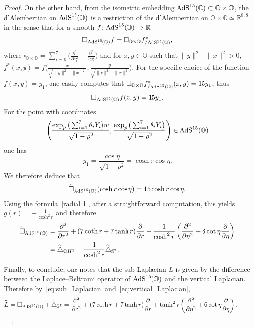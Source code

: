 \documentclass[pdftex]{sigma}
\numberwithin{equation}{section}
\begin{document}
\begin{proof}
On the other hand, from the isometric embedding ${\rm AdS}^{15}(\mathbb{O}) \subset \mathbb{O} \times \mathbb{O}$, the d'Alembertian on ${\rm AdS}^{15}(\mathbb{O})$ is a restriction of the d'Alembertian on $\mathbb{O} \times \mathbb{O} \simeq \mathbb{R}^{8,8}$ in the sense that for a smooth $f\colon {\rm AdS}^{15}(\mathbb{O}) \to \mathbb{R}$
\[
\square_{{\rm AdS}^{15}(\mathbb{O})} f =\square_{\mathbb O \times \mathbb O} f^*_{/ {\rm AdS}^{15}(\mathbb{O})},
\]
where $\square_{\mathbb O \times \mathbb O}=\sum_{i=0}^7 \big( \frac{\partial^2}{\partial x_i^2} - \frac{\partial^2}{\partial y_i^2} \big)$ and for $x,y \in \mathbb O$ such that $\| y\|^2 -\|x\|^2 >0$, $f^*(x,y)= f \big( \frac{x}{\sqrt{\| y \|^2 -\| x \|^2}}, \frac{y}{\sqrt{\| y \|^2 -\| x \|^2}}\big)$. For the specific choice of the function $f(x,y)=y_1$, one easily computes that $ \square_{\mathbb O \times \mathbb O} f^*_{/ {\rm AdS}^{15}(\mathbb{O})}(x,y) = 15y_1$, thus
\[
\square_{{\rm AdS}^{15}(\mathbb{O})} f (x,y)=15y_1.
\]
For the point with coordinates
\[
\left(\frac{ \exp_p\big(\sum_{i=1}^{7}\theta_i Y_i\big) w}{\sqrt{1-{\rho}^2}},\frac{ \exp_p\big(\sum_{i=1}^{7}\theta_i Y_i\big)}{\sqrt{1-{\rho}^2}}\right)\in {\rm AdS}^{15}(\mathbb{O})
\]
one has
\[
y_1=\frac{\cos \eta}{\sqrt{1-{\rho}^2}}= \cosh r \cos \eta.
\]
We therefore deduce that
\[
\widetilde{\square}_{{\rm AdS}^{15}(\mathbb{O})}(\cosh r \cos \eta) =15 \cosh r \cos \eta.
\]
Using the formula~\eqref{radial 1}, after a straightforward computation, this yields $g(r)=-\frac{1}{\cosh^2 r}$ and therefore
\begin{align*}
\widetilde{\square}_{{\rm AdS}^{15}(\mathbb{O})}&=\frac{{\partial}^2}{\partial {r}^2}+(7\coth r+7\tanh r)\frac{{\partial}}{\partial {r}} -\frac{1}{\cosh^2 r} \left(\frac{{\partial}^2}{\partial {\eta}^2}+6\cot \eta\frac{{\partial}}{\partial {\eta}} \right)\nonumber\\
& =\widetilde{\triangle}_{\mathbb{O}H^1}-\frac{1}{\cosh^2 r}\widetilde{\triangle}_{\mathbb{S}^7}.%
\end{align*}

Finally, to conclude, one notes that the sub-Laplacian $L$ is given by the difference between the Laplace--Beltrami operator of ${\rm AdS}^{15}(\mathbb{O})$ and the vertical Laplacian. Therefore by~\eqref{eq:sub_Laplacian} and~\eqref{eq:vertical_Laplacian},
\begin{align*}
\widetilde{L} =\tilde{\square}_{{\rm AdS}^{15}(\mathbb{O})}+ \tilde{\triangle}_{\mathbb{S}^{7}}
 = \frac{{\partial}^2}{\partial {r}^2}+(7\coth r+7\tanh r)\frac{{\partial}}{\partial {r}}+{\tanh^2 r}\left(\frac{{\partial}^2}{\partial {\eta}^2}+6\cot \eta\frac{{\partial}}{\partial {\eta}}\right).\tag*{\qed}
\end{align*}\renewcommand{\qed}{}
\end{proof}
\end{document}
